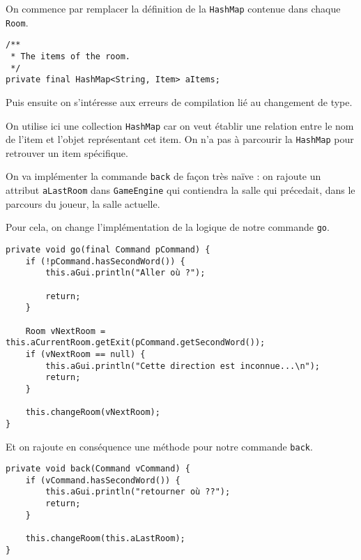 \begin{exercise}[subtitle=Items]

On commence par remplacer la définition de la \verb|HashMap| contenue dans chaque \verb|Room|.

\begin{verbatim}
/**
 * The items of the room.
 */
private final HashMap<String, Item> aItems;
\end{verbatim}

Puis ensuite on s'intéresse aux erreurs de compilation lié au changement de type.

On utilise ici une collection \verb|HashMap| car on veut établir une relation entre le nom de l'item et l'objet représentant cet item. On n'a pas à parcourir la \verb|HashMap| pour retrouver un item spécifique.
\end{exercise}

\begin{exercise}[subtitle=back]

On va implémenter la commande \verb|back| de façon très naïve : on rajoute un attribut \verb|aLastRoom| dans \verb|GameEngine| qui contiendra la salle qui précedait, dans le parcours du joueur, la salle actuelle.

Pour cela, on change l'implémentation de la logique de notre commande \verb|go|.

\begin{verbatim}
private void go(final Command pCommand) {
    if (!pCommand.hasSecondWord()) {
        this.aGui.println("Aller où ?");

        return;
    }

    Room vNextRoom = this.aCurrentRoom.getExit(pCommand.getSecondWord());
    if (vNextRoom == null) {
        this.aGui.println("Cette direction est inconnue...\n");
        return;
    }

    this.changeRoom(vNextRoom);
}
\end{verbatim}

Et on rajoute en conséquence une méthode pour notre commande \verb|back|.

\begin{verbatim}
private void back(Command vCommand) {
    if (vCommand.hasSecondWord()) {
        this.aGui.println("retourner où ??");
        return;
    }

    this.changeRoom(this.aLastRoom);
}
\end{verbatim}
\end{exercise}

